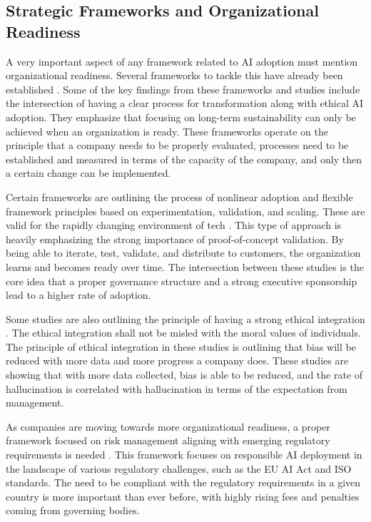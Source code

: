 \documentclass[]{imc-inf}
\begin{document}
\subsection{Strategic Frameworks and Organizational Readiness}

A very important aspect of any framework related to AI adoption must mention organizational readiness. Several frameworks to tackle this have already been established \citep{Kurup2022, Dasgupta2019, Radhakrishnan2022, Madanchian2025}. Some of the key findings from these frameworks and studies include the intersection of having a clear process for transformation along with ethical AI adoption. They emphasize that focusing on long-term sustainability can only be achieved when an organization is ready. These frameworks operate on the principle that a company needs to be properly evaluated, processes need to be established and measured in terms of the capacity of the company, and only then a certain change can be implemented.

Certain frameworks are outlining the process of nonlinear adoption and flexible framework principles based on experimentation, validation, and scaling. These are valid for the rapidly changing environment of tech \citep{Dasgupta2019, Radhakrishnan2022, Madanchian2025}. This type of approach is heavily emphasizing the strong importance of proof-of-concept validation. By being able to iterate, test, validate, and distribute to customers, the organization learns and becomes ready over time. The intersection between these studies is the core idea that a proper governance structure and a strong executive sponsorship lead to a higher rate of adoption.

Some studies are also outlining the principle of having a strong ethical integration \citep{Madanchian2025, Chowdhury2022, Jarrahi2023, Pumplun2019}. The ethical integration shall not be misled with the moral values of individuals. The principle of ethical integration in these studies is outlining that bias will be reduced with more data and more progress a company does. These studies are showing that with more data collected, bias is able to be reduced, and the rate of hallucination is correlated with hallucination in terms of the expectation from management.

As companies are moving towards more organizational readiness, a proper framework focused on risk management aligning with emerging regulatory requirements is needed \citep{Parlov2025}. This framework focuses on responsible AI deployment in the landscape of various regulatory challenges, such as the EU AI Act and ISO standards. The need to be compliant with the regulatory requirements in a given country is more important than ever before, with highly rising fees and penalties coming from governing bodies.
\end{document}
